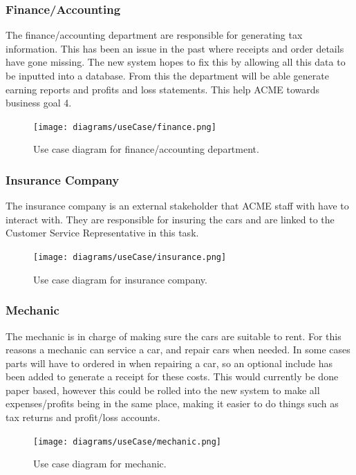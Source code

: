     \subsubsection{Finance/Accounting}
      The finance/accounting department are responsible for generating tax information. This has been an issue in the past where
      receipts and order details have gone missing. The new system hopes to fix this by allowing all this data to be inputted into 
      a database. From this the department will be able generate earning reports and profits and loss statements. This help ACME 
      towards business goal 4.
      \begin{figure}[H]
        \centering
        \texttt{[image: diagrams/useCase/finance.png]}
        \caption{Use case diagram for finance/accounting department.}
        \label{fig:UCaccounting}
      \end{figure}

    \subsubsection{Insurance Company}
      The insurance company is an external stakeholder that ACME staff with have to interact with. They are responsible for insuring the cars and
      are linked to the Customer Service Representative in this task.
      \begin{figure}[H]
        \centering
        \texttt{[image: diagrams/useCase/insurance.png]}
        \caption{Use case diagram for insurance company.}
        \label{fig:UCinsurance}
      \end{figure}
      
    \subsubsection{Mechanic}
      The mechanic is in charge of making sure the cars are suitable to rent. For this reasons a mechanic can service a car, and repair cars
      when needed. In some cases parts will have to ordered in when repairing a car, so an optional include has been added to generate a receipt
      for these costs. This would currently be done paper based, however this could be rolled into the new system to make all expenses/profits 
      being in the same place, making it easier to do things such as tax returns and profit/loss accounts.
      \begin{figure}[H]
        \centering
        \texttt{[image: diagrams/useCase/mechanic.png]}
        \caption{Use case diagram for mechanic.}
        \label{fig:UCmechanic}
      \end{figure}

